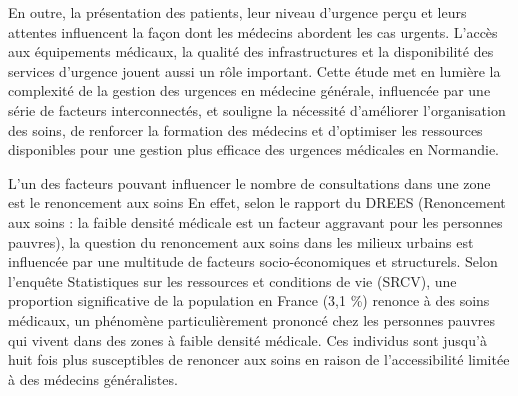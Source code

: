 \documentclass[
]{article}
\begin{document}
En outre, la présentation des patients, leur niveau d'urgence perçu et
leurs attentes influencent la façon dont les médecins abordent les cas
urgents. L'accès aux équipements médicaux, la qualité des
infrastructures et la disponibilité des services d'urgence jouent aussi
un rôle important. Cette étude met en lumière la complexité de la
gestion des urgences en médecine générale, influencée par une série de
facteurs interconnectés, et souligne la nécessité d'améliorer
l'organisation des soins, de renforcer la formation des médecins et
d'optimiser les ressources disponibles pour une gestion plus efficace
des urgences médicales en Normandie.

L'un des facteurs pouvant influencer le nombre de consultations dans une
zone est le renoncement aux soins En effet, selon le rapport du DREES
(Renoncement aux soins : la faible densité médicale est un facteur
aggravant pour les personnes pauvres), la question du renoncement aux
soins dans les milieux urbains est influencée par une multitude de
facteurs socio-économiques et structurels. Selon l'enquête Statistiques
sur les ressources et conditions de vie (SRCV), une proportion
significative de la population en France (3,1 \%) renonce à des soins
médicaux, un phénomène particulièrement prononcé chez les personnes
pauvres qui vivent dans des zones à faible densité médicale. Ces
individus sont jusqu'à huit fois plus susceptibles de renoncer aux soins
en raison de l'accessibilité limitée à des médecins généralistes.
\end{document}
